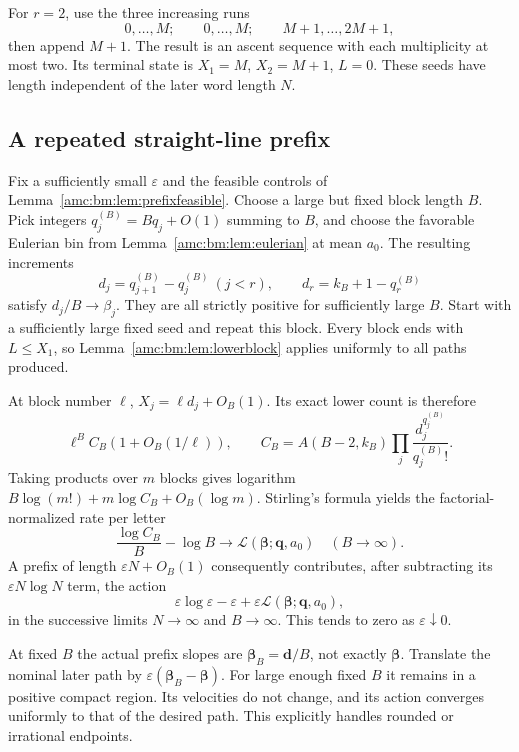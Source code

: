 \documentclass[11pt,letterpaper]{article}
\theoremstyle{remark}\newtheorem{remark}[theorem]{Remark}
\newcommand{\cL}{\mathcal L}
\begin{document}
For $r=2$, use the three increasing runs
\[
 0,\ldots,M;\qquad 0,\ldots,M;\qquad M+1,\ldots,2M+1,
\]
then append $M+1$. The result is an ascent sequence with each multiplicity at most two. Its terminal state is $X_1=M$, $X_2=M+1$, $L=0$. These seeds have length independent of the later word length $N$.

\subsection{A repeated straight-line prefix}
Fix a sufficiently small $\varepsilon$ and the feasible controls of Lemma~\ref{amc:bm:lem:prefixfeasible}. Choose a large but fixed block length $B$. Pick integers $q_j^{(B)}=Bq_j+O(1)$ summing to $B$, and choose the favorable Eulerian bin from Lemma~\ref{amc:bm:lem:eulerian} at mean $a_0$. The resulting increments
\[
 d_j=q_{j+1}^{(B)}-q_j^{(B)}\ (j<r),\qquad
 d_r=k_B+1-q_r^{(B)}
\]
satisfy $d_j/B\to\beta_j$. They are all strictly positive for sufficiently large $B$. Start with a sufficiently large fixed seed and repeat this block. Every block ends with $L\le X_1$, so Lemma~\ref{amc:bm:lem:lowerblock} applies uniformly to all paths produced.

At block number $\ell$, $X_j=\ell d_j+O_B(1)$. Its exact lower count is therefore
\[
 \ell^B C_B(1+O_B(1/\ell)),\qquad
 C_B=A(B-2,k_B)\prod_j\frac{d_j^{q_j^{(B)}}}{q_j^{(B)}!}.
\]
Taking products over $m$ blocks gives logarithm
$B\log(m!)+m\log C_B+O_B(\log m)$. Stirling's formula yields the factorial-normalized rate per letter
\[
 \frac{\log C_B}{B}-\log B
 \longrightarrow\cL(\boldsymbol\beta;\boldsymbol q,a_0)
 \quad(B\to\infty).
\]
A prefix of length $\varepsilon N+O_B(1)$ consequently contributes, after subtracting its $\varepsilon N\log N$ term, the action
\begin{equation}\label{amc:bm:eq:prefixaction}
 \varepsilon\log\varepsilon-\varepsilon
 +\varepsilon\cL(\boldsymbol\beta;\boldsymbol q,a_0),
\end{equation}
in the successive limits $N\to\infty$ and $B\to\infty$. This tends to zero as $\varepsilon\downarrow0$.

At fixed $B$ the actual prefix slopes are $\boldsymbol\beta_B=\boldsymbol d/B$, not exactly $\boldsymbol\beta$. Translate the nominal later path by $\varepsilon(\boldsymbol\beta_B-\boldsymbol\beta)$. For large enough fixed $B$ it remains in a positive compact region. Its velocities do not change, and its action converges uniformly to that of the desired path. This explicitly handles rounded or irrational endpoints.
\end{document}
